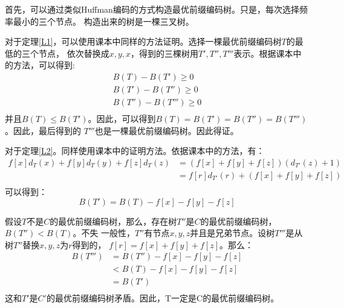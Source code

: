 \documentclass[a4paper, 11pt]{article}
\theoremstyle{plain}\newtheorem{Lemma}{定理}
\begin{document}
	首先，可以通过类似Huffman编码的方式构造最优前缀编码树。只是，每次选择频率最小的三个节点。
构造出来的树是一棵三叉树。

	对于定理\ref{L1}，可以使用课本中同样的方法证明。选择一棵最优前缀编码树$T$的最低的三个节点，
依次替换成$x,y,x$，得到的三棵树用$T',T'', T'''$表示。根据课本中的方法，可以得到:
\begin{displaymath}
\begin{array}{l}
	B(T)-B(T') \ge 0\\
	B(T')-B(T'') \ge 0\\
	B(T'')-B(T''') \ge 0\\
\end{array}
\end{displaymath} 
并且$B(T) \le B(T')$。因此，可以得到$B(T) = B(T')= B(T'')= B(T''')$。因此，最后得到的
$T'''$也是一棵最优前缀编码树。因此得证。

	对于定理\ref{L2}。同样使用课本中的证明方法。依据课本中的方法，有：
\begin{displaymath}
\begin{array}{rl}
f[x]d_{T}(x) + f[y]d_{T}(y) + f[z]d_{T}(z)& = (f[x]+f[y]+f[z])(d_{T'}(z)+1)\\
&=f[r]d_{T'}(r)+(f[x]+f[y]+f[z])\\
\end{array}
\end{displaymath}
可以得到：
\begin{displaymath}
	B(T')=B(T)-f[x]-f[y]-f[z]
\end{displaymath}

假设$T$不是$C$的最优前缀编码树，那么，存在树$T''$是$C$的最优前缀编码树，$B(T'')<B(T)$。不失
一般性，$T''$有节点$x,y,z$并且是兄弟节点。设树$T'''$是从树$T''$替换$x,y,z$为$r$得到的，
$f[r]=f[x]+f[y]+f[z]$。那么：
\begin{displaymath}
\begin{array}{rl}
B(T''')& = B(T'')-f[x]-f[y]-f[z]\\
       & < B(T)-f[x]-f[y]-f[z]\\
       & = B(T')\\
\end{array}
\end{displaymath}
这和$T'$是$C'$的最优前缀编码树矛盾。因此，T一定是C的最优前缀编码树。
\end{document}
